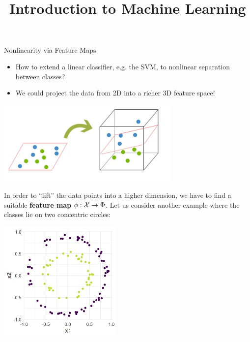 




\newcommand{\titlefigure}{figure/circles_boundary.png}
\newcommand{\learninggoals}{
  \item Understand how nonlinearity can be introduced via feature maps in SVMs
  \item Know the limitation of feature maps 
}

\title{Introduction to Machine Learning}
\date{}





\begin{vbframe}{Nonlinearity via Feature Maps}
\begin{itemize}
\item How to extend a linear classifier, e.g. the SVM, to nonlinear separation between classes? 
\item We could project the data from 2D into a richer 3D feature space!
\end{itemize}

\vspace{1cm} 
\begin{center}
\includegraphics[width=9cm]{figure_man/kernels/svm_dummies_kernelling.PNG}
\end{center}

\framebreak 


  In order to \enquote{lift} the data points into a higher dimension, we have to find a suitable \textbf{feature map} $\phi : \mathcal{X} \to \Phi$.
Let us consider another example where the classes lie on two concentric circles:

\begin{center}
\includegraphics[width=6cm]{figure/circles_ds.png}
\end{center}


\end{vbframe}
